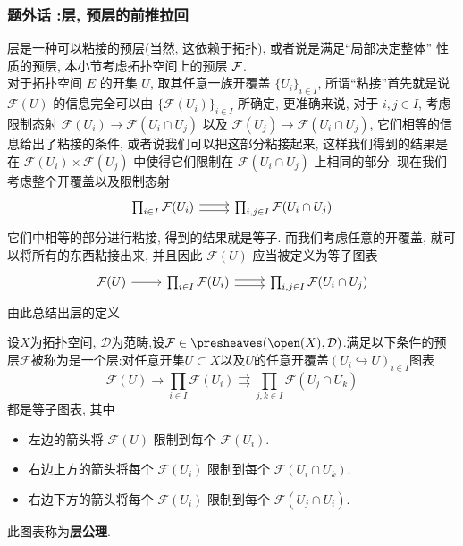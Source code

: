 \subsubsection{题外话 :层, 预层的前推拉回}
层是一种可以粘接的预层(当然, 这依赖于拓扑), 或者说是满足``局部决定整体'' 性质的预层, 本小节考虑拓扑空间上的预层 $\cal{F}$.\\
对于拓扑空间 $E$ 的开集 $U$, 取其任意一族开覆盖 $\{U_i\}_{i\in I}$, 所谓``粘接''首先就是说 $\mathcal{F}(U)$ 的信息完全可以由 $\{\mathcal{F}(U_i)\}_{i\in I}$ 所确定, 更准确来说, 对于 $i,j \in I$, 考虑限制态射 $\mathcal{F}(U_i) \to \mathcal{F}(U_i\cap U_j)$ 以及 $\mathcal{F}(U_j) \to \mathcal{F}(U_i\cap U_j)$, 它们相等的信息给出了粘接的条件, 或者说我们可以把这部分粘接起来, 这样我们得到的结果是在 $\mathcal{F}(U_i) \times \mathcal{F}(U_j)$ 中使得它们限制在 $\mathcal{F}(U_i \cap U_j)$ 上相同的部分. 现在我们考虑整个开覆盖以及限制态射
\[\begin{tikzcd}
	{\prod_{i\in I}\mathcal{F}(U_i)} & {\prod_{i,j\in I}\mathcal{F}(U_i \cap U_j)}
	\arrow[shift left, from=1-1, to=1-2]
	\arrow[shift right, from=1-1, to=1-2]
\end{tikzcd}\]
它们中相等的部分进行粘接, 得到的结果就是等子. 而我们考虑任意的开覆盖, 就可以将所有的东西粘接出来, 并且因此 $\mathcal{F}(U)$ 应当被定义为等子图表
\[\begin{tikzcd}
	{\mathcal{F}(U)} & {\prod_{i\in I}\mathcal{F}(U_i)} & {\prod_{i,j\in I}\mathcal{F}(U_i \cap U_j)}
	\arrow[from=1-1, to=1-2]
	\arrow[shift left, from=1-2, to=1-3]
	\arrow[shift right, from=1-2, to=1-3]
\end{tikzcd}\]
由此总结出层的定义
\begin{definition}[$\mathcal{D}$-值层]\label{定义:拓扑空间上的层公理}
    设$X$为拓扑空间, $\mathcal{D}$为范畴,设$\mathcal{F}\in \presheaves(\open(X),\mathcal{D})$.满足以下条件的预层$\mathcal{F}$被称为是一个层:对任意开集$U\subset X$以及$U$的任意开覆盖$(U_i\hookrightarrow U)_{i\in I}$图表
    \[
        \mathcal{F} (U)
        \to \prod_{i \in I} \mathcal{F} (U_i)
        \rightrightarrows \prod_{j,k \in I} \mathcal{F} (U_j \cap U_k)
    \]
    都是等子图表, 其中
    \begin{itemize}
        \item
            左边的箭头将 $\mathcal{F} (U)$ 限制到每个 $\mathcal{F} (U_i)$.
        \item
            右边上方的箭头将每个 $\mathcal{F} (U_i)$ 限制到每个 $\mathcal{F} (U_i \cap U_k)$.
        \item
            右边下方的箭头将每个 $\mathcal{F} (U_i)$ 限制到每个 $\mathcal{F} (U_j \cap U_i)$.
    \end{itemize}
    此图表称为\textbf{层公理}.
\end{definition}
